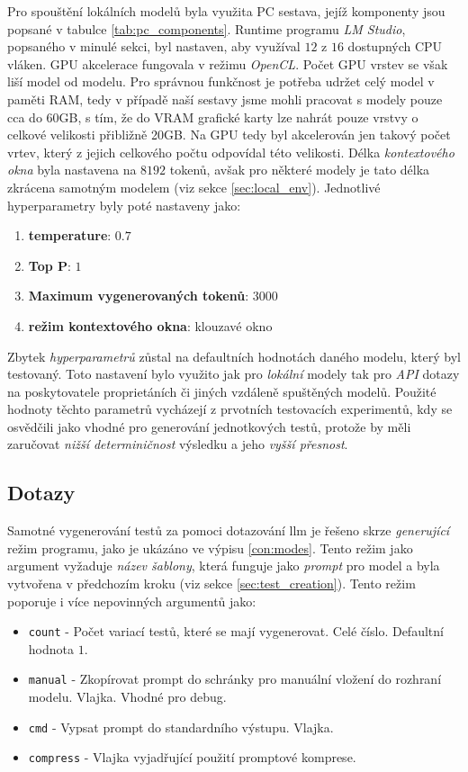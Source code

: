 \documentclass[czech, ma, kiv, he, iso690numb, pdf, viewonly]{fasthesis}
\begin{document}
            Pro spouštění lokálních modelů byla využita PC sestava, jejíž komponenty jsou popsané v tabulce \ref{tab:pc_components}. Runtime programu \textit{LM Studio}, popsaného v minulé sekci, byl nastaven, aby využíval \(12\) z \(16\) dostupných CPU vláken. GPU akcelerace fungovala v režimu \textit{OpenCL}. Počet GPU vrstev se však liší model od modelu. Pro správnou funkčnost je potřeba udržet celý model v paměti RAM, tedy v případě naší sestavy jsme mohli pracovat s modely pouze cca do 60GB, s tím, že do VRAM grafické karty lze nahrát pouze vrstvy o celkové velikosti přibližně 20GB. Na GPU tedy byl akcelerován jen takový počet vrtev, který z jejich celkového počtu odpovídal této velikosti. Délka \textit{kontextového okna} byla nastavena na \(8 192\) \gls{token}ů, avšak pro některé modely je tato délka zkrácena samotným modelem (viz sekce \ref{sec:local_env}). Jednotlivé hyperparametry byly poté nastaveny jako:
            \begin{enumerate}
                \item \textbf{\gls{temperature}}: \(0.7\)
                \item \textbf{Top P}: \(1\)
                \item \textbf{Maximum vygenerovaných tokenů}: \(3000\)
                \item \textbf{režim kontextového okna}: klouzavé okno
            \end{enumerate}
            Zbytek \emph{hyperparametrů} zůstal na defaultních hodnotách daného modelu, který byl testovaný. Toto nastavení bylo využito jak pro \textit{lokální} modely tak pro \textit{API} dotazy na poskytovatele proprietáních či jiných vzdáleně spuštěných modelů. Použité hodnoty těchto parametrů vycházejí z prvotních testovacích experimentů, kdy se osvědčili jako vhodné pro generování jednotkových testů, protože by měli zaručovat \textit{nižší determiničnost} výsledku a jeho \textit{vyšší přesnost}.

        \subsection{Dotazy} \label{sec:llm_requests}
        Samotné vygenerování testů za pomoci dotazování \Gls{llm} je řešeno skrze \textit{generující} režim programu, jako je ukázáno ve výpisu \ref{con:modes}. Tento režim jako argument vyžaduje \textit{název šablony}, která funguje jako \textit{prompt} pro model a byla vytvořena v předchozím kroku (viz sekce \ref{sec:test_creation}). Tento režim poporuje i více nepovinných argumentů jako:
        \begin{itemize}
            \item \verb|count| - Počet variací testů, které se mají vygenerovat. Celé číslo. Defaultní hodnota \(1\).
            \item \verb|manual| - Zkopírovat prompt do schránky pro manuální vložení do rozhraní modelu. Vlajka. Vhodné pro debug.
            \item \verb|cmd| - Vypsat prompt do standardního výstupu. Vlajka.
            \item \verb|compress| - Vlajka vyjadřující použití promptové komprese.
        \end{itemize}
\end{document}
